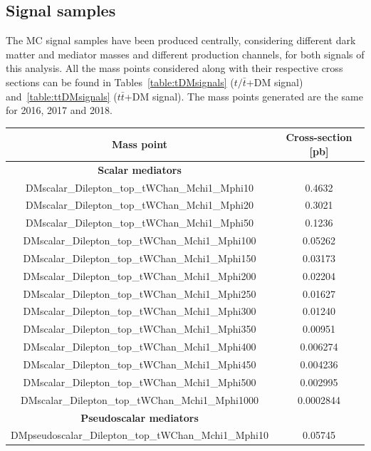 \documentclass[a4paper, 10pt, openright]{report}
\begin{document}
\begin{appendices}
\section{Signal samples}  \label{appendix:SignalSamples}

The \ac{MC} signal samples have been produced centrally, considering different dark matter and mediator masses and different production channels, for both signals of this analysis. All the mass points considered along with their respective cross sections can be found in Tables~\ref{table:tDMsignals} ($t/ \bar t$+DM signal) and~\ref{table:ttDMsignals} ($t \bar t$+DM signal). The mass points generated are the same for 2016, 2017 and 2018.

\begin{table}
\begin{center}
\begin{tabular}{ c|c } 
 \hline
 Mass point & Cross-section [pb] \\
\hline
\textbf{Scalar mediators} & \\
 DMscalar\_Dilepton\_top\_tWChan\_Mchi1\_Mphi10 & 0.4632 \\
 DMscalar\_Dilepton\_top\_tWChan\_Mchi1\_Mphi20 & 0.3021 \\
 DMscalar\_Dilepton\_top\_tWChan\_Mchi1\_Mphi50 & 0.1236 \\
 DMscalar\_Dilepton\_top\_tWChan\_Mchi1\_Mphi100 & 0.05262 \\
 DMscalar\_Dilepton\_top\_tWChan\_Mchi1\_Mphi150 & 0.03173 \\
 DMscalar\_Dilepton\_top\_tWChan\_Mchi1\_Mphi200 & 0.02204 \\
 DMscalar\_Dilepton\_top\_tWChan\_Mchi1\_Mphi250 & 0.01627 \\
 DMscalar\_Dilepton\_top\_tWChan\_Mchi1\_Mphi300 & 0.01240 \\
 DMscalar\_Dilepton\_top\_tWChan\_Mchi1\_Mphi350 & 0.00951 \\
 DMscalar\_Dilepton\_top\_tWChan\_Mchi1\_Mphi400 & 0.006274 \\
 DMscalar\_Dilepton\_top\_tWChan\_Mchi1\_Mphi450 & 0.004236 \\
 DMscalar\_Dilepton\_top\_tWChan\_Mchi1\_Mphi500 & 0.002995 \\
 DMscalar\_Dilepton\_top\_tWChan\_Mchi1\_Mphi1000 & 0.0002844 \\
 \hline
 \textbf{Pseudoscalar mediators} & \\
 DMpseudoscalar\_Dilepton\_top\_tWChan\_Mchi1\_Mphi10 & 0.05745 \\

\end{tabular}
\end{center}
\end{table}
\end{appendices}
\end{document}
